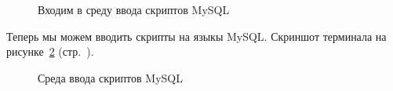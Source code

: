 \begin{figure}[!htp]
    \caption{Входим в среду ввода скриптов MySQL}
    \label{fig:make-phpmyadmin-superuser-step-0}
\end{figure}

Теперь мы можем вводить скрипты на языкы MySQL. Скриншот терминала на рисунке~\ref{fig:make-phpmyadmin-superuser-step-1} (стр.~\pageref{fig:make-phpmyadmin-superuser-step-1}).

\begin{figure}[!htp]
    \caption{Среда ввода скриптов MySQL}
    \label{fig:make-phpmyadmin-superuser-step-1}
\end{figure}

